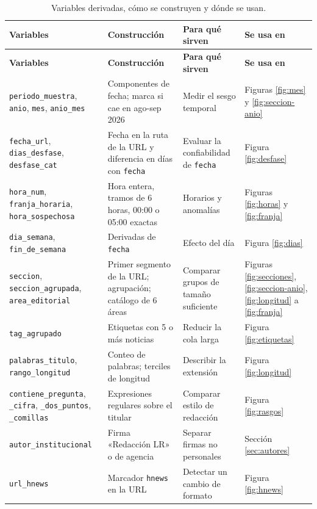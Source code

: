 \documentclass[12pt,a4paper]{article}
\begin{document}
{\small
\begin{longtable}{p{4.1cm}p{4.2cm}p{3.3cm}p{2.5cm}}
\caption{Variables derivadas, cómo se construyen y dónde se usan.}\\
\toprule
\textbf{Variables} & \textbf{Construcción} & \textbf{Para qué sirven} & \textbf{Se usa en}\\\midrule
\endfirsthead
\toprule
\textbf{Variables} & \textbf{Construcción} & \textbf{Para qué sirven} & \textbf{Se usa en}\\\midrule
\endhead
\texttt{periodo\_muestra}, \texttt{anio}, \texttt{mes}, \texttt{anio\_mes} & Componentes de fecha; marca si cae en ago-sep 2026 & Medir el sesgo temporal & Figuras \ref{fig:mes} y \ref{fig:seccion-anio}\\
\texttt{fecha\_url}, \texttt{dias\_desfase}, \texttt{desfase\_cat} & Fecha en la ruta de la URL y diferencia en días con \texttt{fecha} & Evaluar la confiabilidad de \texttt{fecha} & Figura \ref{fig:desfase}\\
\texttt{hora\_num}, \texttt{franja\_horaria}, \texttt{hora\_sospechosa} & Hora entera, tramos de 6 horas, 00:00 o 05:00 exactas & Horarios y anomalías & Figuras \ref{fig:horas} y \ref{fig:franja}\\
\texttt{dia\_semana}, \texttt{fin\_de\_semana} & Derivadas de \texttt{fecha} & Efecto del día & Figura \ref{fig:dias}\\
\texttt{seccion}, \texttt{seccion\_agrupada}, \texttt{area\_editorial} & Primer segmento de la URL; agrupación; catálogo de 6 áreas & Comparar grupos de tamaño suficiente & Figuras \ref{fig:secciones}, \ref{fig:seccion-anio}, \ref{fig:longitud} a \ref{fig:franja}\\
\texttt{tag\_agrupado} & Etiquetas con 5 o más noticias & Reducir la cola larga & Figura \ref{fig:etiquetas}\\
\texttt{palabras\_titulo}, \texttt{rango\_longitud} & Conteo de palabras; terciles de longitud & Describir la extensión & Figura \ref{fig:longitud}\\
\texttt{contiene\_pregunta}, \texttt{\_cifra}, \texttt{\_dos\_puntos}, \texttt{\_comillas} & Expresiones regulares sobre el titular & Comparar estilo de redacción & Figura \ref{fig:rasgos}\\
\texttt{autor\_institucional} & Firma «Redacción LR» o de agencia & Separar firmas no personales & Sección \ref{sec:autores}\\
\texttt{url\_hnews} & Marcador \texttt{hnews} en la URL & Detectar un cambio de formato & Figura \ref{fig:hnews}\\
\bottomrule
\end{longtable}
}
\end{document}
